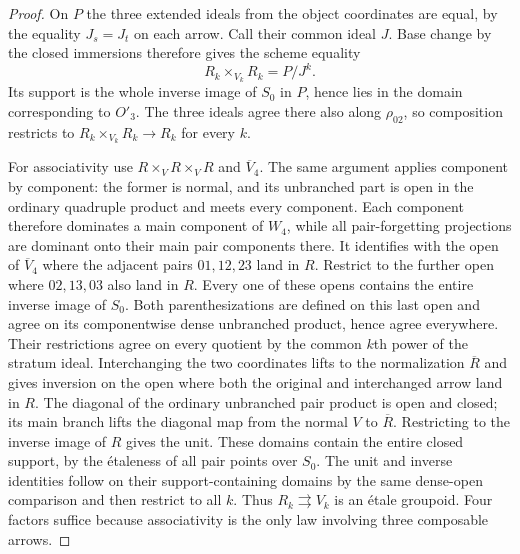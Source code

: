 \begin{proof}
On $P$ the three extended ideals from the object coordinates are
equal, by the equality $J_s=J_t$ on each arrow.  Call their common
ideal $J$.  Base change by the closed immersions therefore gives the
scheme equality
\[
 R_k\times_{V_k}R_k=P/J^k.
\]
Its support is the whole inverse image of $S_0$ in $P$, hence lies in
the domain corresponding to $O'_3$.  The three ideals agree there
also along $\rho_{02}$, so composition restricts to
$R_k\times_{V_k}R_k\to R_k$ for every $k$.

For associativity use $R\times_VR\times_VR$ and $\overline V_4$.
The same argument applies component by component: the former is
normal, and its unbranched part is open in the ordinary quadruple
product and meets every component.  Each component therefore dominates
a main component of $W_4$, while all pair-forgetting projections are
dominant onto their main pair components there.  It identifies with the open of
$\overline V_4$ where the adjacent pairs $01,12,23$ land in $R$.
Restrict to the further open where $02,13,03$ also land in $R$.
Every one of these opens contains the entire inverse image of $S_0$.
Both parenthesizations are defined on this last open and agree on
its componentwise dense unbranched product, hence agree everywhere.
Their restrictions agree on every quotient by the common $k$th
power of the stratum ideal.  Interchanging the two coordinates lifts
to the normalization $\overline R$ and gives inversion on the open
where both the original and interchanged arrow land in $R$.  The
diagonal of the ordinary unbranched pair product is open and closed;
its main branch lifts the diagonal map from the normal $V$ to
$\overline R$.  Restricting to the inverse image of $R$ gives the unit.
These domains contain the entire closed support, by the \'etaleness of
all pair points over $S_0$.  The unit and inverse identities follow on their
support-containing domains by the same dense-open comparison and
then restrict to all $k$.  Thus $R_k\rightrightarrows V_k$ is an
\'etale groupoid.  Four factors suffice because associativity is the
only law involving three composable arrows.


\end{proof}
